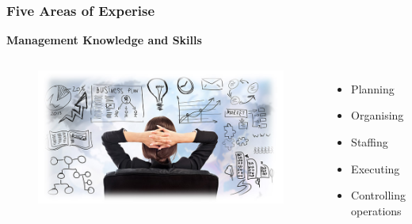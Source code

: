 \documentclass[aspectratio=169]{beamer}
\begin{document}
\begin{frame}
\frametitle{Five Areas of Experise}
\textbf{Management Knowledge and Skills}\\
\vspace{0.5cm}
\begin{columns}[b]
\begin{figure}
\includegraphics[scale=0.23]{management}
\end{figure}
\begin{itemize}
\item Planning
\item Organising
\item Staffing
\item Executing
\item Controlling operations
\end{itemize}
\end{columns}
\end{frame}
\end{document}
